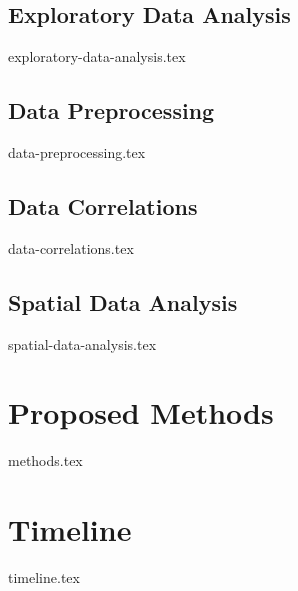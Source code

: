 \documentclass[a4paper, 11pt]{article}
\begin{document}
\subsection{Exploratory Data Analysis}
{exploratory-data-analysis.tex}

\subsection{Data Preprocessing}
{data-preprocessing.tex}

\subsection{Data Correlations} \label{correlations}
{data-correlations.tex}

\subsection{Spatial Data Analysis}
{spatial-data-analysis.tex}

\clearpage

\section{Proposed Methods}
{methods.tex}
\clearpage

\section{Timeline}
{timeline.tex}
\clearpage

\printbibliography
\end{document}
